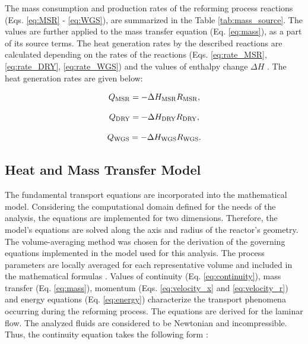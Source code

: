 \documentclass[preprint,12pt]{elsarticle}
\begin{document}
The mass consumption and production rates of the reforming process reactions (Eqs. \eqref{eq:MSR} - \eqref{eq:WGS}), are summarized in the Table \ref{tab:mass_source}. The values are further applied to the mass transfer equation (Eq. \eqref{eq:mass}), as a part of its source terms. The  heat generation rates by the described reactions are calculated depending on the rates of the reactions (Eqs. \eqref{eq:rate_MSR}, \eqref{eq:rate_DRY}, \eqref{eq:rate_WGS}) and the values of enthalpy change $\Delta H$ \cite{Xu1989, Brus2012}. The heat generation rates are given below: 

\begin{equation}
 \label{eq:q_MSR}
Q_{\rm{MSR}} = -\Delta H_{\rm{MSR}}R_{\rm{MSR}},
\end{equation}

\begin{equation}
 \label{eq:q_DRY}
Q_{\rm{DRY}} = -\Delta H_{\rm{DRY}}R_{\rm{DRY}},
\end{equation}

\begin{equation}
 \label{eq:q_WGS}
Q_{\rm{WGS}} = -\Delta H_{\rm{WGS}}R_{\rm{WGS}}.
\end{equation}
  
\vspace{\fill}

\subsection{Heat and Mass Transfer Model}
\label{subsec:heat_model}

The fundamental transport equations are incorporated into the mathematical model. Considering the computational domain defined for the needs of the analysis, the equations are implemented for two dimensions. Therefore, the model's equations are solved along the axis and radius of the reactor's geometry. The volume-averaging method was chosen for the derivation of the governing equations implemented in the model used for this analysis. The process parameters are locally averaged for each representative volume and included in the mathematical formulas \cite{Carbonell1984}. Values of continuity \linebreak (Eq. \eqref{eq:continuity}), mass transfer (Eq. \eqref{eq:mass}), momentum (Eqs. \eqref{eq:velocity_x} and \eqref{eq:velocity_r}) and energy equations (Eq. \eqref{eq:energy}) characterize the transport phenomena occurring during the reforming process. The equations are derived for the laminar flow. The analyzed fluids are considered to be Newtonian and incompressible. Thus, the continuity equation takes the following form \cite{Nishino2003, Nishino2006}: 
\end{document}

